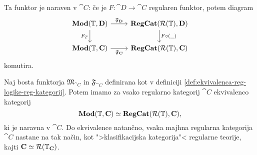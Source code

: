 \documentclass[../kategoricna_logika.tex]{subfiles}
\begin{document}
Ta funktor je naraven v $\cat{C}$: če je $F : \cat{D} \to \cat{C}$
regularen funktor, potem diagram
\begin{equation}\label{diag:naravnost-F}
  \begin{tikzcd}
    \Mod(\T, \cat{D}) \ar[d, "F_T"'] \ar[r, "\mathfrak{F}_{\cat{D}}"] & \cat{RegCat}(\mathcal{R}(\T), \cat{D}) \ar[d, "F \circ (\_)"] \\
    \Mod(\T, \cat{C}) \ar[r, "\mathfrak{F}_{\cat{C}}"'] &
    \cat{RegCat}(\mathcal{R}(\T), \cat{C})
  \end{tikzcd}
\end{equation}
komutira.
\begin{izrek}
  Naj bosta funktorja $\mathfrak{M}_{\cat{C}}$ in
  $\mathfrak{F}_{\cat{C}}$ definirana kot v definiciji
  \ref{def:ekvivalenca-reg-logike-reg-kategorij}. Potem imamo za vsako
  regularno kategorij $\cat{C}$ ekvivalenco kategorij
  $$\mathbf{Mod}(\mathbb{T}, {\operatorname{\mathbf{C}}}) \simeq {\operatorname{\mathbf{RegCat}}}(\mathcal{R}(\mathbb{T}), {\operatorname{\mathbf{C}}}),$$
  ki je naravna v $\cat{C}$. Do ekvivalence natančno, vsaka majhna
  regularna kategorija $\cat{C}$ nastane na tak način, kot
  ">klasifikacijska kategorija"< regularne teorije, kajti
  ${\operatorname{\mathbf{C}}} \simeq \mathcal{R}(\mathbb{T}_{{\operatorname{\mathbf{C}}}})$.
\end{izrek}
\end{document}
